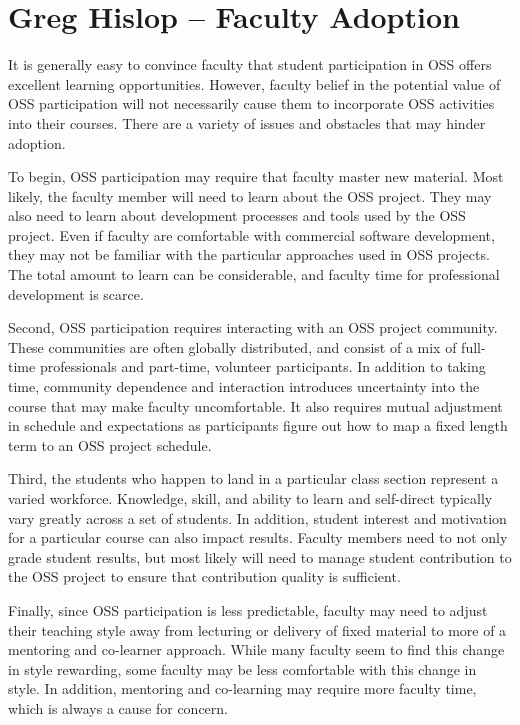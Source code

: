 \documentclass{sig-alternate}
\begin{document}
\section{Greg Hislop -- Faculty Adoption}        
It is generally easy to convince faculty that student participation in OSS offers excellent learning opportunities.  However, faculty belief in the potential value of OSS participation will not necessarily cause them to incorporate OSS activities into their courses.  There are a variety of issues and obstacles that may hinder adoption.

To begin, OSS participation may require that faculty master new material.  Most likely, the faculty member will need to learn about the OSS project.  They may also need to learn about development processes and tools used by the OSS project.  Even if faculty are comfortable with commercial software development, they may not be familiar with the particular approaches used in OSS projects.  The total amount to learn can be considerable, and faculty time for professional development is scarce.

Second, OSS participation requires interacting with an OSS project community.  These communities are often globally distributed, and consist of a mix of full-time professionals and part-time, volunteer participants.  In addition to taking time, community dependence and interaction introduces uncertainty into the course that may make faculty uncomfortable.  It also requires mutual adjustment in schedule and expectations as participants figure out how to map a fixed length term to an OSS project schedule.

Third, the students who happen to land in a particular class section represent a varied workforce.  Knowledge, skill, and ability to learn and self-direct typically vary greatly across a set of students. In addition, student interest and motivation for a particular course can also impact results.  Faculty members need to not only grade student results, but most likely will need to manage student contribution to the OSS project to ensure that contribution quality is sufficient.

Finally, since OSS participation is less predictable, faculty may need to adjust their teaching style away from lecturing or delivery of fixed material to more of a mentoring and co-learner approach.  While many faculty seem to find this change in style rewarding, some faculty may be less comfortable with this change in style.  In addition, mentoring and co-learning may require more faculty time, which is always a cause for concern.
    
\end{document}
